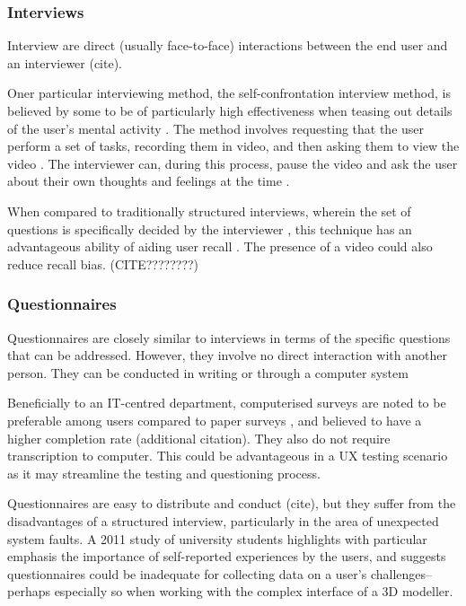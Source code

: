 \documentclass{scrartcl}
\begin{document}
\subsubsection{Interviews}
Interview are direct (usually face-to-face) interactions between the end user and an interviewer (cite).

Oner particular interviewing method, the self-confrontation interview method, is believed by some to be of particularly high effectiveness when teasing out details of the user's mental activity \cite{bach_combining_2011} \cite{lim_self-confrontation_2002}. The method involves requesting that the user perform a set of tasks, recording them in video, and then asking them to view the video \cite{cranach_analysis_1982}. The interviewer can, during this process, pause the video and ask the user about their own thoughts and feelings at the time \cite{lim_self-confrontation_2002}.

When compared to traditionally structured interviews, wherein the set of questions is specifically decided by the interviewer \cite{wilson_interview_2013}, this technique has an advantageous ability of aiding user recall \cite{lim_self-confrontation_2002}. The presence of a video could also reduce recall bias. (CITE????????)

\subsubsection{Questionnaires}
Questionnaires are closely similar to interviews in terms of the specific questions that can be addressed. However, they involve no direct interaction with another person. They can be conducted in writing or through a computer system

Beneficially to an IT-centred department, computerised surveys are noted to be preferable among users compared to paper surveys \cite{computersurveys}, and believed to have a higher completion rate (additional citation). They also do not require transcription to computer. This could be advantageous in a UX testing scenario as it may streamline the testing and questioning process.

Questionnaires are easy to distribute and conduct (cite), but they suffer from the disadvantages of a structured interview, particularly in the area of unexpected system faults. A 2011 study of university students \cite{bach_combining_2011} highlights with particular emphasis the importance of self-reported experiences by the users, and suggests questionnaires could be inadequate for collecting data on a user's challenges--perhaps especially so when working with the complex interface of a 3D modeller.
\end{document}
